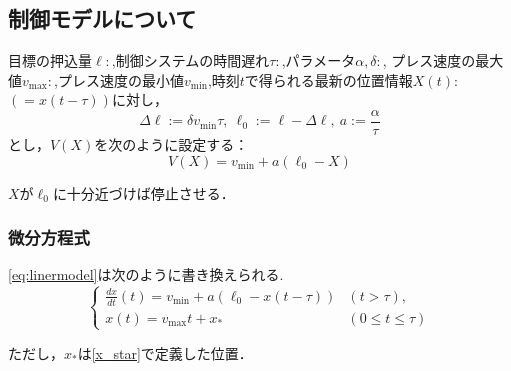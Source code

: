 \documentclass [dvipdfmx] {jsarticle}
\numberwithin{equation}{section}
\theoremstyle{definition} %
\theoremstyle{definition} %
\begin{document}
\subsection{制御モデルについて}
目標の押込量$\ell:$,制御システムの時間遅れ$\tau:$,パラメータ$\alpha,\delta:$,
プレス速度の最大値$v_{\max}:$,プレス速度の最小値$v_{\min}$,時刻$t$で得られる最新の位置情報$X(t):$
$(=x(t-\tau))$に対し，
\begin{equation}
    \Delta\ell :=\delta v_{\min}\tau,\ \ell_0:=\ell-\Delta\ell,\ a:=\frac{\alpha}{\tau}
\end{equation}
とし，$V(X)$を次のように設定する：
\begin{equation}\label{eq:linermodel}
    V(X)=v_{\min}+a(\ell_0-X)
\end{equation}

$X$が$\ell_0$に十分近づけば停止させる．


\subsubsection{微分方程式}
\eqref{eq:linermodel}は次のように書き換えられる.
\begin{equation}\label{eq:liner}\begin{cases}
    \displaystyle\frac{dx}{dt}(t)=v_{\min}+a(\ell_0-x(t-\tau)) &(t>\tau),\\
    x(t)=v_{\max}t+x_\ast &(0\le t \le \tau)
\end{cases}\end{equation}

ただし，$x_\ast$は\eqref{x_star}で定義した位置．
\end{document}
